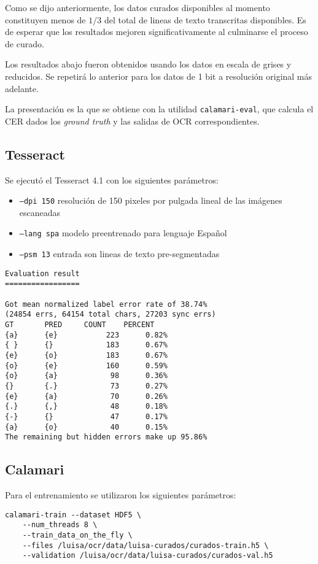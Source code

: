 \documentclass{article}
\begin{document}
Como se dijo anteriormente, los datos curados disponibles al momento constituyen
menos de $1/3$ del total de lineas de texto transcritas disponibles. Es de esperar
que los resultados mejoren significativamente al culminarse el proceso de curado.

Los resultados abajo fueron obtenidos usando los datos en escala de grises y reducidos.
Se repetirá lo anterior para los datos de 1 bit a resolución original más adelante.

La presentación es la que se obtiene con la utilidad
\texttt{calamari-eval}, que calcula el CER dados los \emph{ground truth} y las
salidas de OCR correspondientes.

\subsection{Tesseract}

Se ejecutó el Tesseract 4.1 con los siguientes parámetros:
\begin{itemize}
\item \texttt{--dpi 150} resolución de 150 pixeles por pulgada lineal de las imágenes escaneadas
\item \texttt{--lang spa} modelo preentrenado para lenguaje Español
\item \texttt{--psm 13}   entrada son lineas de texto pre-segmentadas
\end{itemize}

\begin{verbatim}
Evaluation result
=================

Got mean normalized label error rate of 38.74% 
(24854 errs, 64154 total chars, 27203 sync errs)
GT       PRED     COUNT    PERCENT   
{a}      {e}           223      0.82%
{ }      {}            183      0.67%
{e}      {o}           183      0.67%
{o}      {e}           160      0.59%
{o}      {a}            98      0.36%
{}       {.}            73      0.27%
{e}      {a}            70      0.26%
{.}      {,}            48      0.18%
{-}      {}             47      0.17%
{a}      {o}            40      0.15%
The remaining but hidden errors make up 95.86%

\end{verbatim}

\subsection{Calamari}

Para el entrenamiento se utilizaron los siguientes parámetros:
\begin{verbatim}
calamari-train --dataset HDF5 \
	--num_threads 8 \
	--train_data_on_the_fly \
	--files /luisa/ocr/data/luisa-curados/curados-train.h5 \
	--validation /luisa/ocr/data/luisa-curados/curados-val.h5 
\end{verbatim}
\end{document}
